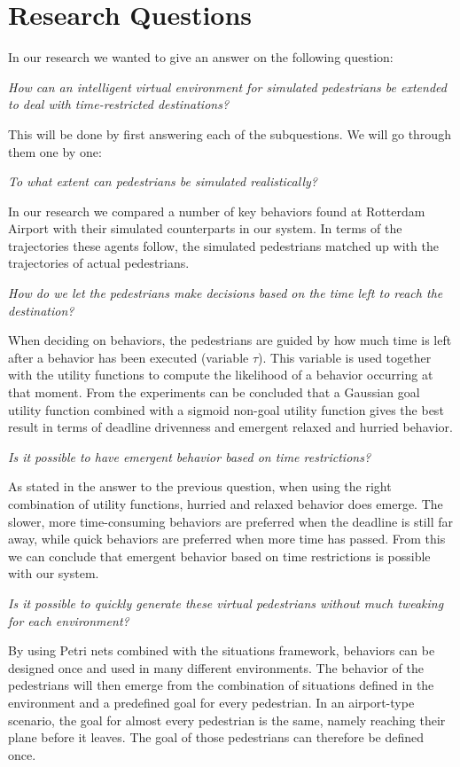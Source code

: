 \documentclass[11pt, a4paper]{book}
\begin{document}
\section{Research Questions}
In our research we wanted to give an answer on the following question:
\begin{center}
\emph{How can an intelligent virtual environment for simulated pedestrians be extended to deal with time-restricted destinations?}
\end{center}
This will be done by first answering each of the subquestions. We will go through them one by one:
\begin{center}
\emph{To what extent can pedestrians be simulated realistically?}
\end{center}
In our research we compared a number of key behaviors found at Rotterdam Airport with their simulated counterparts in our system. In terms of the trajectories these agents follow, the simulated pedestrians matched up with the trajectories of actual pedestrians. 
\begin{center}
\emph{How do we let the pedestrians make decisions based on the time left to reach the destination?}
\end{center}
When deciding on behaviors, the pedestrians are guided by how much time is left after a behavior has been executed (variable $\tau$). This variable is used together with the utility functions to compute the likelihood of a behavior occurring at that moment. From the experiments can be concluded that a Gaussian goal utility function combined with a sigmoid non-goal utility function gives the best result in terms of deadline drivenness and emergent relaxed and hurried behavior.

\begin{center}
\emph{Is it possible to have emergent behavior based on time restrictions?}
\end{center}
As stated in the answer to the previous question, when using the right combination of utility functions, hurried and relaxed behavior does emerge. The slower, more time-consuming behaviors are preferred when the deadline is still far away, while quick behaviors are preferred when more time has passed. From this we can conclude that emergent behavior based on time restrictions is possible with our system.

\begin{center}
\emph{Is it possible to quickly generate these virtual pedestrians without much tweaking for each environment?}
\end{center}
By using Petri nets combined with the situations framework, behaviors can be designed once and used in many different environments. The behavior of the pedestrians will then emerge from the combination of situations defined in the environment and a predefined goal for every pedestrian. In an airport-type scenario, the goal for almost every pedestrian is the same, namely reaching their plane before it leaves. The goal of those pedestrians can therefore be defined once.
\end{document}
